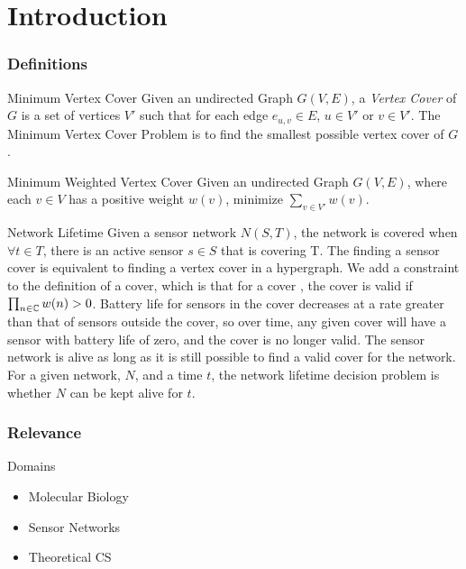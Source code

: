 \section{Introduction}
\begin{frame}[allowframebreaks]
  \frametitle{Definitions}
  \begin{block}{Minimum Vertex Cover}
Given an undirected Graph $G(V,E)$, a {\em Vertex Cover} of $G$ is a set of vertices $V'$ such that for each edge $e_{u,v} \in E$, $u \in V'$ or $v \in V'$. The Minimum Vertex Cover Problem is to find the smallest possible vertex cover of $G$.
  \end{block}
  \begin{block}{Minimum Weighted Vertex Cover}
Given an undirected Graph $G(V,E)$, where each $v \in V$ has a positive weight $w(v)$, minimize $\sum_{v \in V'} w(v)$.
  \end{block}
  \begin{block}{Network Lifetime}
Given a sensor network $N(S,T)$, the network is covered when $\forall t \in T$, there is an active sensor $s \in S$ that is covering T. The finding a sensor cover is equivalent to finding a vertex cover in a hypergraph. We add a constraint to the definition of a cover, which is that for a cover \bCd, the cover is valid if $\prod_{n \in {\mathbb C}} w(n) > 0$. Battery life for sensors in the cover decreases at a rate greater than that of sensors outside the cover, so over time, any given cover will have a sensor with battery life of zero, and the cover is no longer valid. The sensor network is alive as long as it is still possible to find a valid cover for the network. For a given network, $N$, and a time $t$, the network lifetime decision problem is whether $N$ can be kept alive for $t$. 
  \end{block}

\end{frame}

\begin {frame}
  \frametitle{Relevance}
  \begin{block}{Domains}
  \begin{itemize}
	\item Molecular Biology \cite{PhysRevE.65.061910}
	\item Sensor Networks \cite{1514028}
	\item Theoretical CS \cite{1011811}
	\end{itemize}
	\end{block}
\end{frame}

